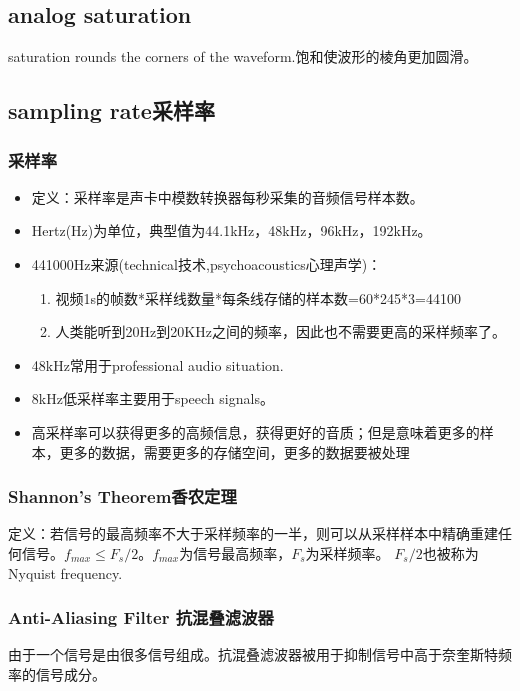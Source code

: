 \documentclass[UTF8]{ctexart}
\begin{document}
\subsection{analog saturation}
saturation rounds the corners of the waveform.饱和使波形的棱角更加圆滑。

\subsection{sampling rate采样率}
\subsubsection{采样率}
\begin{itemize}
    \item 定义：采样率是声卡中模数转换器每秒采集的音频信号样本数。
    \item Hertz(Hz)为单位，典型值为44.1kHz，48kHz，96kHz，192kHz。
    \item 441000Hz来源(technical技术,psychoacoustics心理声学)：
    \begin{enumerate}
        \item 视频1s的帧数*采样线数量*每条线存储的样本数=60*245*3=44100
        \item 人类能听到20Hz到20KHz之间的频率，因此也不需要更高的采样频率了。
    \end{enumerate}
    \item 48kHz常用于professional audio situation.
    \item 8kHz低采样率主要用于speech signals。
    \item 高采样率可以获得更多的高频信息，获得更好的音质；但是意味着更多的样本，更多的数据，需要更多的存储空间，更多的数据要被处理
\end{itemize}

\subsubsection{Shannon's Theorem香农定理}
定义：若信号的最高频率不大于采样频率的一半，则可以从采样样本中精确重建任何信号。$f_{max}\leq F_{s}/2$。$f_{max}$为信号最高频率，$F_{s}$为采样频率。
$F_{s}/2$也被称为 Nyquist frequency.

\subsubsection{Anti-Aliasing Filter 抗混叠滤波器}

由于一个信号是由很多信号组成。抗混叠滤波器被用于抑制信号中高于奈奎斯特频率的信号成分。
\end{document}
